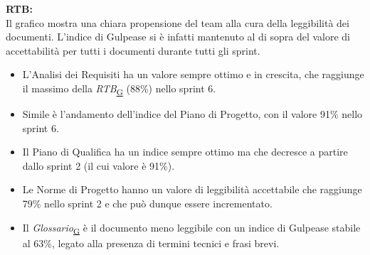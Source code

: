 \documentclass[a4paper,12pt]{article}
\begin{document}
{{        \noindent \textbf{RTB:} \\
        Il grafico mostra una chiara propensione del team alla cura della leggibilità dei documenti. L'indice di Gulpease si è infatti mantenuto al di sopra del valore di accettabilità per tutti i documenti durante tutti gli sprint.
        \begin{itemize}[labelindent=0pt, leftmargin=*]
            \item L'Analisi dei Requisiti ha un valore sempre ottimo e in crescita, che raggiunge il massimo della \textit{RTB}\textsubscript{\href{https://atlasteam9.github.io/Atlas/glossario.html\#RTB}{G}} (88\%) nello sprint 6.
            \item Simile è l'andamento dell'indice del Piano di Progetto, con il valore 91\% nello sprint 6.
            \item Il Piano di Qualifica ha un indice sempre ottimo ma che decresce a partire dallo sprint 2 (il cui valore è 91\%).
            \item Le Norme di Progetto hanno un valore di leggibilità accettabile che raggiunge 79\% nello sprint 2 e che può dunque essere incrementato. 
            \item Il \textit{Glossario}\textsubscript{\href{https://atlasteam9.github.io/Atlas/glossario.html\#Glossario}{G}} è il documento meno leggibile con un indice di Gulpease stabile al 63\%, legato alla presenza di termini tecnici e frasi brevi.
        \end{itemize}
        
}}
\end{document}
